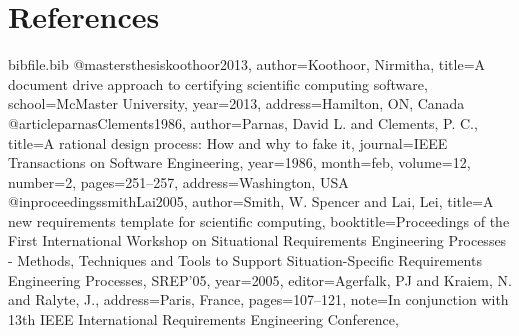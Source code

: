 \documentclass[12pt]{article}
\begin{document}
\section{References}
\label{Sec:References}
\begin{filecontents*}{bibfile.bib}
@mastersthesis{koothoor2013,
author={Koothoor, Nirmitha},
title={A document drive approach to certifying scientific computing software},
school={McMaster University},
year={2013},
address={Hamilton, ON, Canada}}
@article{parnasClements1986,
author={Parnas, David L. and Clements, P. C.},
title={A rational design process: How and why to fake it},
journal={IEEE Transactions on Software Engineering},
year={1986},
month=feb,
volume={12},
number={2},
pages={251--257},
address={Washington, USA}}
@inproceedings{smithLai2005,
author={Smith, W. Spencer and Lai, Lei},
title={A new requirements template for scientific computing},
booktitle={Proceedings of the First International Workshop on Situational Requirements Engineering Processes - Methods, Techniques and Tools to Support Situation-Specific Requirements Engineering Processes, SREP'05},
year={2005},
editor={Agerfalk, PJ and Kraiem, N. and Ralyte, J.},
address={Paris, France},
pages={107--121},
note={In conjunction with 13th IEEE International Requirements Engineering Conference,}}
\end{filecontents*}
\nocite{*}
\printbibliography[heading=none]
\end{document}
